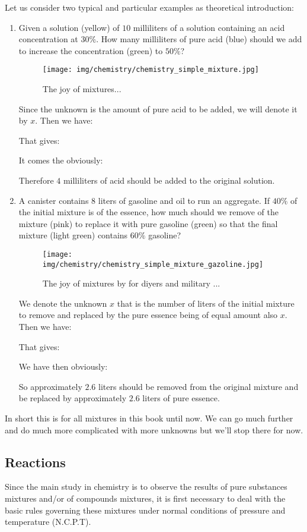 	Let us consider two typical and particular examples as theoretical introduction:
	\begin{enumerate}
		\item Given a solution (yellow) of $10$ milliliters of a solution containing an acid concentration at $30\%$. How many milliliters of pure acid (blue) should we add to increase the concentration (green) to $50\%$?
		\begin{figure}[H]
			\begin{center}
			\texttt{[image: img/chemistry/chemistry\_simple\_mixture.jpg]}
			\end{center}	
			\caption{The joy of mixtures...}
		\end{figure}
		Since the unknown is the amount of pure acid to be added, we will denote it by $x$. Then we have:
		
		That gives:
		
		It comes the obviously:
		
		Therefore $4$ milliliters of acid should be added to the original solution.
		
		\item  A canister contains $8$ liters of gasoline and oil to run an aggregate. If $40\%$ of the initial mixture is of the essence, how much should we remove of the mixture (pink) to replace it with pure gasoline (green) so that the final mixture (light green) contains $60\%$ gasoline?
		\begin{figure}[H]
			\begin{center}
			\texttt{[image: img/chemistry/chemistry\_simple\_mixture\_gazoline.jpg]}
			\end{center}	
			\caption{The joy of mixtures by for diyers and military ...}
		\end{figure}
		We denote the unknown $x$ that is the number of liters of the initial mixture to remove and replaced by the pure essence being of equal amount also $x$. Then we have:
		
		That gives:
		
		We have then obviously:
		
		So approximately $2.6$ liters should be removed from the original mixture and be replaced by approximately $2.6$ liters of pure essence.
	\end{enumerate}
	In short this is for all mixtures in this book until now. We can go much further and do much more complicated with more unknowns but we'll stop there for now.
	
	\subsection{Reactions}
	Since the main study in chemistry is to observe the results of pure substances mixtures and/or of compounds mixtures, it is first necessary to deal with  the basic rules governing these mixtures under normal conditions of pressure and temperature (N.C.P.T).
	
